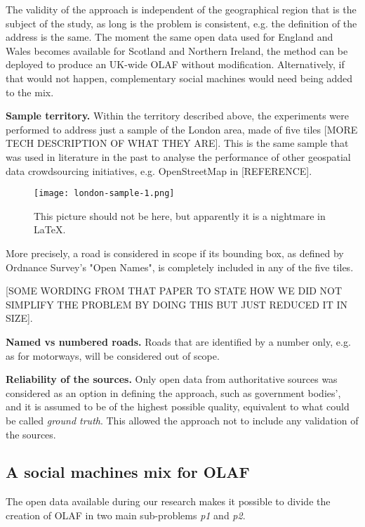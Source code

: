     The validity of the approach is independent of the geographical region that is the subject of the study, as long is the problem is consistent, e.g. the definition of the address is the same. The moment the same open data used for England and Wales becomes available for Scotland and Northern Ireland, the method can be deployed to produce an UK-wide OLAF without modification. Alternatively, if that would not happen, complementary social machines would need being added to the mix.
    
    \textbf{Sample territory.} Within the territory described above, the experiments were performed to address just a sample of the London area, made of five tiles [MORE TECH DESCRIPTION OF WHAT THEY ARE]. This is the same sample that was used in literature in the past to analyse the performance of other geospatial data crowdsourcing initiatives, e.g. OpenStreetMap in [REFERENCE].
    
    \begin{figure*}
    	\texttt{[image: london-sample-1.png]}
    	\caption{This picture should not be here, but apparently it is a nightmare in LaTeX.}
    	\label{fig:london_sample_1}
    \end{figure*}
    
    More precisely, a road is considered in scope if its bounding box, as defined by Ordnance Survey's "Open Names", is completely included in any of the five tiles. 
    
    [SOME WORDING FROM THAT PAPER TO STATE HOW WE DID NOT SIMPLIFY THE PROBLEM BY DOING THIS BUT JUST REDUCED IT IN SIZE].
     
    \textbf{Named vs numbered roads.} Roads that are identified by a number only, e.g. as for motorways, will be considered out of scope.
    
    \textbf{Reliability of the sources.} Only open data from authoritative sources was considered as an option in defining the approach, such as government bodies', and it is assumed to be of the highest possible quality, equivalent to what could be called {\it ground truth}. This allowed the approach not to include any validation of the sources.

\subsection{A social machines mix for OLAF}

    The open data available during our research makes it possible to divide the creation of OLAF in two main sub-problems {\it p1} and {\it p2}. 
    
